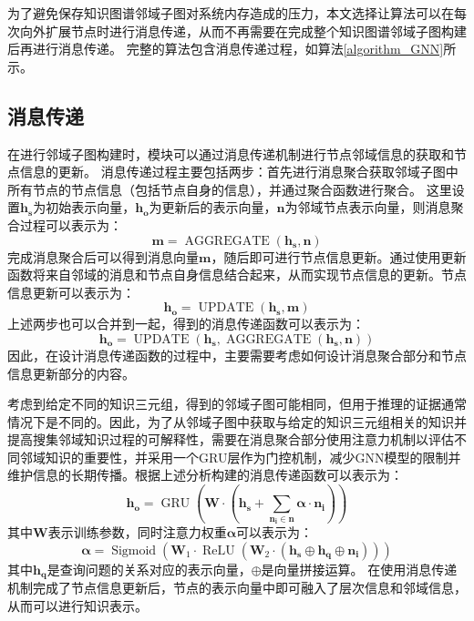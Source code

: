 \documentclass[algorithmlist, AutoFakeBold, AutoFakeSlant, figurelist, tablelist, nomlist, engineering, openany]{seuthesix} %
\begin{document}
为了避免保存知识图谱邻域子图对系统内存造成的压力，本文选择让算法可以在每次向外扩展节点时进行消息传递，从而不再需要在完成整个知识图谱邻域子图构建后再进行消息传递。
完整的算法包含消息传递过程，如算法\ref{algorithm_GNN}所示。

\subsection{消息传递}
在进行邻域子图构建时，模块可以通过消息传递机制进行节点邻域信息的获取和节点信息的更新。
消息传递过程主要包括两步：首先进行消息聚合获取邻域子图中所有节点的节点信息（包括节点自身的信息），并通过聚合函数进行聚合。
这里设置$\bm{h_s}$为初始表示向量，$\bm{h_o}$为更新后的表示向量，$\bm{n}$为邻域节点表示向量，则消息聚合过程可以表示为：
\begin{equation}
  \bm{m} = \operatorname{AGGREGATE}(\bm{h_s}, \bm{n})
\end{equation}
完成消息聚合后可以得到消息向量$\bm{m}$，随后即可进行节点信息更新。通过使用更新函数将来自邻域的消息和节点自身信息结合起来，从而实现节点信息的更新。节点信息更新可以表示为：
\begin{equation}
  \bm{h_o} = \operatorname{UPDATE}(\bm{h_s}, \bm{m})
\end{equation}
上述两步也可以合并到一起，得到的消息传递函数可以表示为：
\begin{equation}
  \bm{h_o} = \operatorname{UPDATE}(\bm{h_s}, \operatorname{AGGREGATE}(\bm{h_s}, \bm{n}))
  \label{equation_MessagePassing}
\end{equation}
因此，在设计消息传递函数的过程中，主要需要考虑如何设计消息聚合部分和节点信息更新部分的内容。

考虑到给定不同的知识三元组，得到的邻域子图可能相同，但用于推理的证据通常情况下是不同的。因此，为了从邻域子图中获取与给定的知识三元组相关的知识并提高搜集邻域知识过程的可解释性，需要在消息聚合部分使用注意力机制以评估不同邻域知识的重要性，并采用一个GRU层作为门控机制，减少GNN模型的限制并维护信息的长期传播。根据上述分析构建的消息传递函数可以表示为：
\begin{equation}
  \bm{h_o} = \operatorname{GRU}(\mathbf{W} \cdot (\bm{h_s} + \sum_{\bm{n_i} \in \bm{n}}{\bm{\alpha} \cdot \bm{n_i}}))
  \label{equation_newMessagePassing}
\end{equation}
其中$\mathbf{W}$表示训练参数，同时注意力权重$\bm{\alpha}$可以表示为：
\begin{equation}
  \bm{\alpha} = \operatorname{Sigmoid}(\mathbf{W}_1 \cdot \operatorname{ReLU}(\mathbf{W}_2 \cdot (\bm{h_s} \oplus \bm{h_q} \oplus \bm{n_i})))
  \label{equation_Alpha}
\end{equation}
其中$\bm{h_q}$是查询问题的关系对应的表示向量，$\oplus$是向量拼接运算。
在使用消息传递机制完成了节点信息更新后，节点的表示向量中即可融入了层次信息和邻域信息，从而可以进行知识表示。
\end{document}
